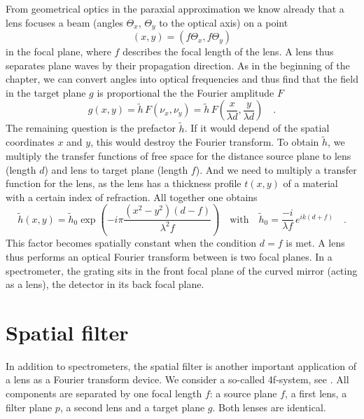 From geometrical optics in the paraxial approximation we know already that a lens focuses a beam  (angles $\Theta_x$, $\Theta_y$ to the optical axis) on a point 
\begin{equation}
(x,y) = (f \Theta_x, f \Theta_y)
\end{equation}
in the focal plane, where $f$ describes the focal length of the lens. A lens thus separates plane waves by their propagation direction. As in the beginning of the chapter, we can convert angles into optical frequencies and thus find that the field in the target plane $g$ is proportional the the Fourier amplitude $F$
\begin{equation}
    g(x,y) = \tilde{h} \,   F \left( \nu_x,\nu_y \right) = \tilde{h} \,  F \left( \frac{x}{\lambda d}, \frac{y}{\lambda d} \right) \quad .
\end{equation}
The remaining question is the prefactor $\tilde{h}$. If it would depend of the spatial coordinates $x$ and $y$, this would destroy the Fourier transform. To obtain $\tilde{h}$, we multiply the transfer functions of free space for the distance source plane to lens (length $d$) and lens to target plane (length $f$). And we need to multiply a transfer function for the lens, as the lens has a thickness profile $t(x,y)$ of a material with a certain index of refraction. All together one obtains
\begin{equation}
    \tilde{h}(x,y) =  \tilde{h}_0 \exp \left( 
-i \pi \frac{(x^2 - y^2)(d-f)}{\lambda^2 f}
    \right) \quad \text{with} \quad  \tilde{h}_0  = \frac{-i}{\lambda f} \, e^{ik (d+f)} \quad .
\end{equation}
This factor becomes spatially constant when the condition $d=f$ is met. A lens thus performs an optical Fourier transform between is two focal planes. In a spectrometer, the grating sits in the front focal plane of the curved mirror (acting as a lens), the detector in its back focal plane.



\section{Spatial filter}


In addition to spectrometers, the spatial filter is another important application of a lens as a Fourier transform device. We consider a so-called 4f-system, see \cite{SalehTeich1991}. All components are separated by one focal length $f$: a source plane $f$, a first lens, a filter plane $p$, a second lens and a target plane $g$. Both lenses are identical. 

